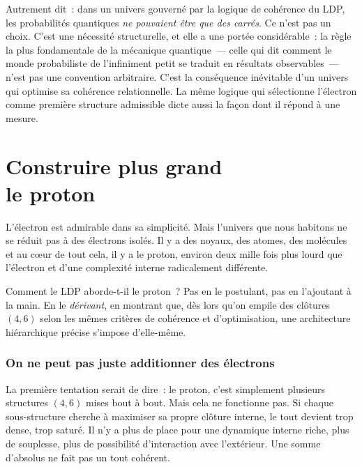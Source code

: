\documentclass[12pt, a4paper, openright]{book}
\begin{document}
\medskip

Autrement dit~: dans un univers gouverné par la logique de cohérence du LDP, les probabilités quantiques \emph{ne pouvaient être que des carrés}. Ce n'est pas un choix. C'est une nécessité structurelle, et elle a une portée considérable~: la règle la plus fondamentale de la mécanique quantique~--- celle qui dit comment le monde probabiliste de l'infiniment petit se traduit en résultats observables~--- n'est pas une convention arbitraire. C'est la conséquence inévitable d'un univers qui optimise sa cohérence relationnelle. La même logique qui sélectionne l'électron comme première structure admissible dicte aussi la façon dont il répond à une mesure.

\chapter[Construire plus grand --- le proton]{Construire plus grand \\ le proton}

L'électron est admirable dans sa simplicité. Mais l'univers que nous habitons ne se réduit pas à des électrons isolés. Il y a des noyaux, des atomes, des molécules et au c\oe{}ur de tout cela, il y a le proton, environ deux mille fois plus lourd que l'électron et d'une complexité interne radicalement différente.

\medskip

Comment le LDP aborde-t-il le proton~? Pas en le postulant, pas en l'ajoutant à la main. En le \emph{dérivant}, en montrant que, dès lors qu'on empile des clôtures $(4,6)$ selon les mêmes critères de cohérence et d'optimisation, une architecture hiérarchique précise s'impose d'elle-même.

\subsection*{On ne peut pas juste additionner des électrons}

La première tentation serait de dire~: le proton, c'est simplement plusieurs structures $(4,6)$ mises bout à bout. Mais cela ne fonctionne pas. Si chaque sous-structure cherche à maximiser sa propre clôture interne, le tout devient trop dense, trop saturé. Il n'y a plus de place pour une dynamique interne riche, plus de souplesse, plus de possibilité d'interaction avec l'extérieur. Une somme d'absolus ne fait pas un tout cohérent.
\end{document}
